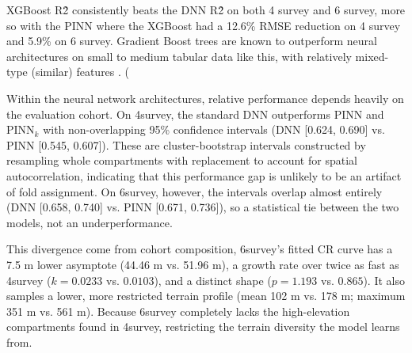 XGBoost R\^2 consistently beats the DNN R\^2 on both 4 survey and 6 survey, more so with the PINN where the XGBoost had a 12.6\% RMSE reduction on 4 survey and 5.9\% on 6 survey. Gradient Boost trees are known to outperform neural architectures on small to medium tabular data like this, with relatively mixed-type (similar) features \cite{shwartzziv2021Tabular_C4_NN}. (



Within the neural network architectures, relative performance depends heavily on the evaluation cohort. On 4survey, the standard DNN outperforms PINN and $\text{PINN}_k$ with non-overlapping 95\% confidence intervals (DNN [0.624, 0.690] vs. PINN [0.545, 0.607]). These are cluster-bootstrap intervals constructed by resampling whole compartments with replacement to account for spatial autocorrelation, indicating that this performance gap is unlikely to be an artifact of fold assignment. On 6survey, however, the intervals overlap almost entirely (DNN [0.658, 0.740] vs. PINN [0.671, 0.736]), so a statistical tie between the two models, not an underperformance.

This divergence come from cohort composition, 6survey’s fitted CR curve has a 7.5 m lower asymptote (44.46 m vs. 51.96 m), a growth rate over twice as fast as 4survey ($k = 0.0233$ vs. $0.0103$), and a distinct shape ($p = 1.193$ vs. $0.865$). It also samples a lower, more restricted terrain profile (mean 102 m vs. 178 m; maximum 351 m vs. 561 m). Because 6survey completely lacks the high-elevation compartments found in 4survey, restricting the terrain diversity the model learns from. 

